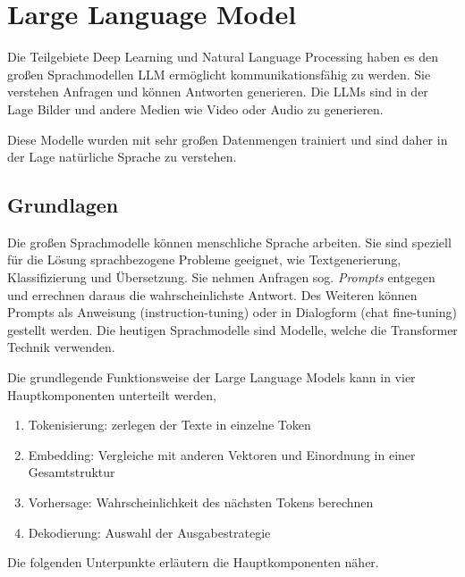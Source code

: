 \section{Large Language Model}
Die Teilgebiete Deep Learning und Natural Language Processing haben es den großen Sprachmodellen \acrshort{LLM} ermöglicht kommunikationsfähig zu werden. Sie verstehen Anfragen und können Antworten generieren. Die LLMs sind in der Lage Bilder und andere Medien wie Video oder Audio zu generieren.\vspace{0.2cm}

Diese Modelle wurden mit sehr großen Datenmengen trainiert und sind daher in der Lage natürliche Sprache zu verstehen.

\subsection{Grundlagen}

Die großen Sprachmodelle können menschliche Sprache arbeiten. Sie sind speziell für die Lösung  sprachbezogene Probleme geeignet, wie Textgenerierung, Klassifizierung und Übersetzung. Sie nehmen Anfragen sog. \textit{Prompts} entgegen und errechnen daraus die wahrscheinlichste Antwort. Des Weiteren können Prompts als Anweisung (instruction-tuning) oder in Dialogform (chat fine-tuning) gestellt werden. Die heutigen Sprachmodelle sind Modelle, welche die Transformer Technik verwenden.

Die grundlegende Funktionsweise der Large Language Models kann in vier Hauptkomponenten unterteilt werden,

\begin{enumerate}
	\item Tokenisierung: zerlegen der Texte in einzelne Token
	\item Embedding: Vergleiche mit anderen Vektoren und Einordnung in einer Gesamtstruktur
	\item Vorhersage: Wahrscheinlichkeit des nächsten Tokens berechnen
	\item Dekodierung: Auswahl der Ausgabestrategie
\end{enumerate}

Die folgenden Unterpunkte erläutern die Hauptkomponenten näher.

